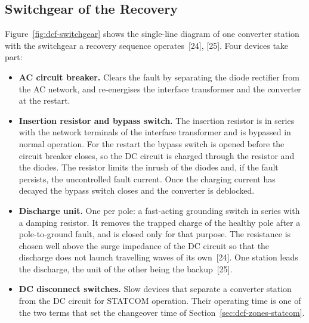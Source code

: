 \subsection{Switchgear of the Recovery}
\label{sec:dcf-switchgear}

Figure~\ref{fig:dcf-switchgear} shows the single-line diagram of one
converter station with the switchgear a recovery sequence operates~[24],
[25]. Four devices take part:

\begin{itemize}[itemsep=0.2em]
  \item \textbf{AC circuit breaker.} Clears the fault by separating the
        diode rectifier from the AC network, and re-energises the interface
        transformer and the converter at the restart.
  \item \textbf{Insertion resistor and bypass switch.} The insertion
        resistor is in series with the network terminals of the interface
        transformer and is bypassed in normal operation. For the restart the
        bypass switch is opened before the circuit breaker closes, so the
        DC circuit is charged through the resistor and the diodes. The
        resistor limits the inrush of the diodes and, if the fault
        persists, the uncontrolled fault current. Once the charging current
        has decayed the bypass switch closes and the converter is
        deblocked.
  \item \textbf{Discharge unit.} One per pole: a fast-acting grounding
        switch in series with a damping resistor. It removes the trapped
        charge of the healthy pole after a pole-to-ground fault, and is
        closed only for that purpose. The resistance is chosen well above
        the surge impedance of the DC circuit so that the discharge does not
        launch travelling waves of its own~[24]. One station leads the
        discharge, the unit of the other being the backup~[25].
  \item \textbf{DC disconnect switches.} Slow devices that separate a
        converter station from the DC circuit for STATCOM operation. Their
        operating time is one of the two terms that set the changeover time
        of Section~\ref{sec:dcf-zones-statcom}.
\end{itemize}

